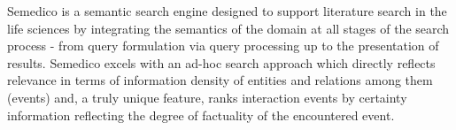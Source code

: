 Semedico is a semantic search engine designed to support literature search in the life sciences by integrating the semantics of the domain at all stages of the search process - from query formulation via query processing up to the presentation of results. Semedico excels with an ad-hoc search approach which directly reflects relevance in terms of information density of entities and relations among them (events) and, a truly unique feature, ranks interaction events by certainty information reflecting the degree of factuality of the encountered event.
